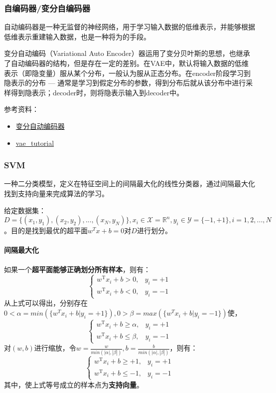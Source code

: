 \subsubsection{自编码器/变分自编码器}
自动编码器是一种无监督的神经网络，用于学习输入数据的低维表示，并能够根据低维表示重建输入数据，也是一种将为的手段。

变分自动编码（Variational Auto Encoder）器运用了变分贝叶斯的思想，也继承了自动编码器的结构，但是存在一定的差别。在VAE中，默认将输入数据的低维表示（即隐变量）服从某个分布，一般认为服从正态分布。在encoder阶段学习到隐表示的分布 --- 通常是学习到假定分布的参数，得到分布后就从该分布中进行采样得到隐表示；decoder时，则将隐表示输入到decoder中。

参考资料：
\begin{itemize}
	\item \href{https://www.cnblogs.com/kexinxin/p/9858525.html}{变分自动编码器}
	\item \href{https://github.com/cdoersch/vae_tutorial}{vae\_tutorial}
\end{itemize}

\subsubsection{SVM}
一种二分类模型，定义在特征空间上的间隔最大化的线性分类器，通过间隔最大化找到支持向量来完成算法的学习。

给定数据集：$D = \{(x_1, y_1), (x_2, y_2), ..., (x_N, y_N)\}, x_i \in \mathcal{X} = \mathbb{R}^n, y_i \in \mathcal{Y} = \{-1, +1\}, i = 1, 2, ..., N$。目的是找到最优的超平面$w^T x + b = 0$对$D$进行划分。

\paragraph{间隔最大化}如果一个\textbf{超平面能够正确划分所有样本}，则有：
$$
\begin{cases}
	{w}^{\mathrm{T}} {x}_{i}+b > 0, & y_{i}=+1 \\ 
	{w}^{\mathrm{T}} {x}_{i}+b < 0, & y_{i}=-1
\end{cases}
$$ 
从上式可以得出，分别存在$0 < \alpha = min(\{w^T x_i + b | y_i = +1\}), 0 > \beta = max(\{w^T x_i + b | y_i = -1\})$使，
$$
\begin{cases}
	{w}^{\mathrm{T}} {x}_{i}+b \geqslant \alpha, & y_{i}=+1 \\ 
	{w}^{\mathrm{T}} {x}_{i}+b \leqslant \beta, & y_{i}=-1
\end{cases}
$$
对$(w, b)$进行缩放，令$w = \frac{w}{min(|\alpha|, |\beta|)}, b = \frac{b}{min(|\alpha|, |\beta|)} $，则有：
$$
\begin{cases}
	{w}^{\mathrm{T}} {x}_{i}+b \geqslant +1, & y_{i}=+1 \\ 
	{w}^{\mathrm{T}} {x}_{i}+b \leqslant -1, & y_{i}=-1
\end{cases}
$$
其中，使上式等号成立的样本点为\textbf{支持向量}。

